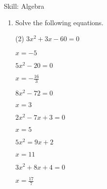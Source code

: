 \begin{bxTip}[colbacktitle=green]{Skill: Algebra}

\begin{enumerate} [leftmargin=0cm] 

\item Solve the following equations.
\begin{tasks}[label=(\alph*), after-item-skip=2pt,after-skip=3pt, label-width=4ex](2)
    \task  $ 3x^2+3x-60=0                      $	           \begin{envAnswer}[blankline=2]    $      x=-5                    $ \end{envAnswer}
    \task  $ 5x^2-20=0                          $	           \begin{envAnswer}[blankline=2]    $      x=-\frac{16}{3}         $ \end{envAnswer}
	\task  $ 8x^2-72=0                         $               \begin{envAnswer}[blankline=2]    $      x=3                     $ \end{envAnswer}
	\task  $ 2x^2-7x+3=0                        $               \begin{envAnswer}[blankline=2]    $      x=5                     $ \end{envAnswer}
    \task  $ 5x^2=9x+2                       $	           \begin{envAnswer}[blankline=3]    $      x=11                    $ \end{envAnswer}
	\task  $ 3x^2+8x+4=0                   $               \begin{envAnswer}[blankline=3]    $      x=\frac{17}{7}          $ \end{envAnswer}
\end{tasks}


\end{enumerate}

\end{bxTip}

















